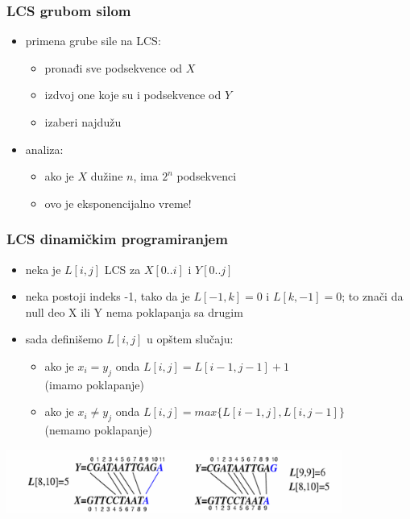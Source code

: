 \documentclass[compress]{beamer}
\begin{document}
\begin{frame}[fragile]
  \frametitle{LCS grubom silom}
  \begin{itemize}
    \item primena grube sile na LCS:
    \begin{itemize}
      \item pronađi sve podsekvence od $X$
      \item izdvoj one koje su i podsekvence od $Y$
      \item izaberi najdužu
    \end{itemize}
    \item analiza:
    \begin{itemize}
      \item ako je $X$ dužine $n$, ima $2^n$ podsekvenci
      \item ovo je eksponencijalno vreme!
    \end{itemize}
  \end{itemize}
\end{frame}

\begin{frame}[fragile]
  \frametitle{LCS dinamičkim programiranjem}
  \begin{itemize}
    \item neka je $L[i,j]$ LCS za $X[0..i]$ i $Y[0..j]$
    \item neka postoji indeks -1, tako da je $L[-1,k]=0$ i $L[k,-1]=0$; 
    to znači da null deo X ili Y nema poklapanja sa drugim
    \item sada definišemo $L[i,j]$ u opštem slučaju:
    \begin{itemize}
      \item ako je $x_{i}=y_{j}$ onda $L[i,j] = L[i-1,j-1]+1$ \\ (imamo poklapanje)
      \item ako je $x_{i}\neq y_{j}$ onda $L[i,j] = max\{L[i-1,j], L[i,j-1]\}$ \\ (nemamo poklapanje)
    \end{itemize}
  \end{itemize}
  \begin{center}
    \includegraphics[width=11cm]{asp-13-pic10.png}
  \end{center}
\end{frame}
\end{document}
